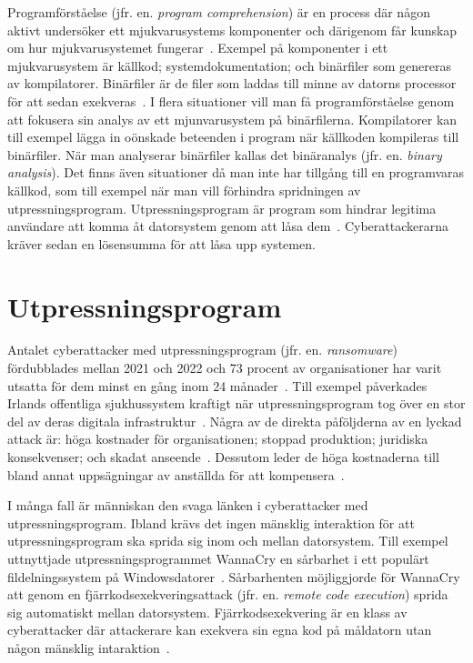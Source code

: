 Programförståelse (jfr. en. \emph{program comprehension}) är en process där någon aktivt undersöker ett mjukvarusystems komponenter och därigenom får kunskap om hur mjukvarusystemet fungerar~\cite{xia2017}.
Exempel på komponenter i ett mjukvarusystem är källkod; systemdokumentation; och binärfiler som genereras av kompilatorer.
Binärfiler är de filer som laddas till minne av datorns processor för att sedan exekveras~\cite{andriesse2018}.
I flera situationer vill man få programförståelse genom att fokusera sin analys av ett mjunvarusystem på binärfilerna.
Kompilatorer kan till exempel lägga in oönskade beteenden i program när källkoden kompileras till binärfiler.
När man analyserar binärfiler kallas det binäranalys (jfr. en. \emph{binary analysis}).
Det finns även situationer då man inte har tillgång till en programvaras källkod, som till exempel när man vill förhindra spridningen av utpressningsprogram.
Utpressningsprogram är program som hindrar legitima användare att komma åt datorsystem genom att låsa dem~\cite{accessscience_computer_virus}.
Cyberattackerarna kräver sedan en lösensumma för att låsa upp systemen.

\section{Utpressningsprogram}

Antalet cyberattacker med utpressningsprogram (jfr. en. \emph{ransomware}) fördubblades mellan 2021 och 2022 och 73 procent av organisationer har varit utsatta för dem minst en gång inom 24 månader~\cite{cyberreason2021, cyberreason2022}.
Till exempel påverkades Irlands offentliga sjukhussystem kraftigt när utpressningsprogram tog över en stor del av deras digitala infrastruktur~\cite{hse_report, gallagher2023}.
Några av de direkta påföljderna av en lyckad attack är: höga kostnader för organisationen; stoppad produktion; juridiska konsekvenser; och skadat anseende~\cite{cyberreason2021, cyberreason2022}.
Dessutom leder de höga kostnaderna till bland annat uppsägningar av anställda för att kompensera~\cite{cyberreason2021, cyberreason2022}.

I många fall är människan den svaga länken i cyberattacker med utpressningsprogram.
Ibland krävs det ingen mänsklig interaktion för att utpressningsprogram ska sprida sig inom och mellan datorsystem.
Till exempel uttnyttjade utpressningsprogrammet WannaCry en sårbarhet i ett populärt fildelningssystem på Windowsdatorer~\cite{alraddadicomprehensive}.
Sårbarhenten möjliggjorde för WannaCry att genom en fjärrkodsexekveringsattack (jfr. en. \emph{remote code execution}) sprida sig automatiskt mellan datorsystem.
Fjärrkodsexekvering är en klass av cyberattacker där attackerare kan exekvera sin egna kod på måldatorn utan någon mänsklig intaraktion~\cite{baker2022}.

